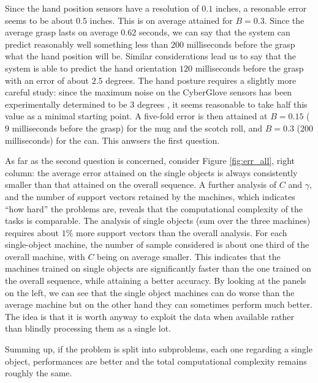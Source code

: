 Since the hand position sensors have a resolution of $0.1$ inches, a
resonable error seems to be about $0.5$ inches. This is on average
attained for $B=0.3$. Since the average grasp lasts on average $0.62$
seconds, we can say that the system can predict reasonably well
something less than $200$ milliseconds before the grasp what the hand
position will be. Similar considerations lead us to say that the
system is able to predict the hand orientation $120$ milliseconds
before the grasp with an error of about $2.5$ degrees. The hand
posture requires a slightly more careful study: since the maximum
noise on the CyberGlove sensors has been experimentally determined to
be $3$ degrees \cite{212431}, it seems reasonable to take half this
value as a minimal starting point. A five-fold error is then attained
at $B=0.15$ ($9$ milliseconds before the grasp) for the mug and the
scotch roll, and $B=0.3$ ($200$ milliseconds) for the can. This
anwsers the first question.

As far as the second question is concerned, consider Figure
\ref{fig:err_all}, right column: the average error attained on the
single objects is always consistently smaller than that attained on
the overall sequence. A further analysis of $C$ and $\gamma$, and the
number of support vectors retained by the machines, which indicates
``how hard'' the problems are, reveals that the computational
complexity of the tasks is comparable. The analysis of single objects
(sum over the three machines) requires about $1\%$ more support
vectors than the overall analysis. For each single-object machine, the
number of sample considered is about one third of the overall machine,
with $C$ being on average smaller. This indicates that the machines
trained on single objects are significantly faster than the one
trained on the overall sequence, while attaining a better accuracy.
By looking at the panels on the left, we can see that the single
object machines can do worse than the average machine but on the 
other hand they can sometimes perform much better. The idea is that 
it is worth anyway to exploit the data when available rather 
than blindly processing them as a single lot.

Summing up, if the problem is split into subproblems, each one
regarding a single object, performances are better and the total
computational complexity remains roughly the same.
